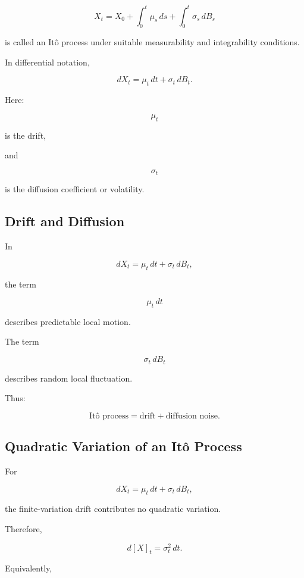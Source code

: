 \[
\boxed{
X_t
=
X_0
+
\int_0^t
\mu_s\,ds
+
\int_0^t
\sigma_s\,dB_s
}
\]

is called an It\^o process under suitable measurability and integrability
conditions.

In differential notation,

\[
\boxed{
dX_t
=
\mu_t\,dt
+
\sigma_t\,dB_t.
}
\]

Here:

\[
\mu_t
\]

is the drift,

and

\[
\sigma_t
\]

is the diffusion coefficient or volatility.

\subsection{Drift and Diffusion}
\label{subsec:drift-diffusion}

In

\[
dX_t
=
\mu_t\,dt
+
\sigma_t\,dB_t,
\]

the term

\[
\mu_t\,dt
\]

describes predictable local motion.

The term

\[
\sigma_t\,dB_t
\]

describes random local fluctuation.

Thus:

\[
\boxed{
\text{It\^o process}
=
\text{drift}
+
\text{diffusion noise}.
}
\]

\subsection{Quadratic Variation of an It\^o Process}
\label{subsec:qv-ito-process}

For

\[
dX_t
=
\mu_t\,dt
+
\sigma_t\,dB_t,
\]

the finite-variation drift contributes no quadratic variation.

Therefore,

\[
\boxed{
d[X]_t
=
\sigma_t^2\,dt.
}
\]

Equivalently,

